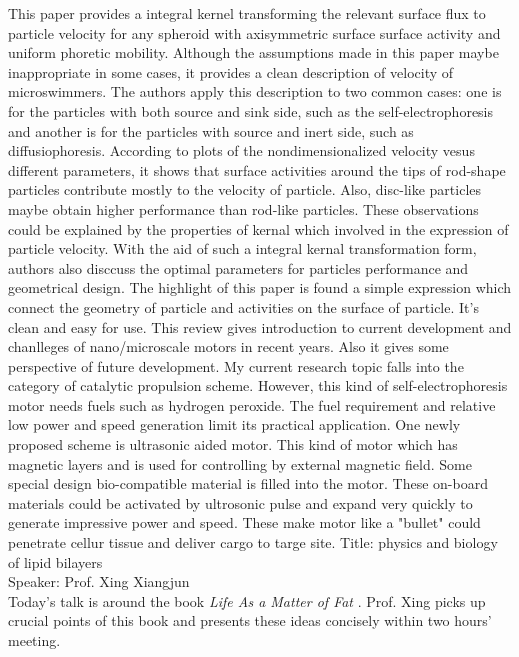\documentclass[fontsize=11pt, %
                             paper=a4, %
                             twoside, %
                             captions=tableheading,
                             index=totoc,
                             hyperref]{labbook}
\begin{document}
\begin{addmargin}[4cm]{0cm}
This paper provides a integral kernel transforming the relevant surface flux to particle velocity for any spheroid with axisymmetric surface surface activity and uniform phoretic mobility. Although the assumptions made in this paper maybe inappropriate in some cases, it provides a clean description of velocity of microswimmers. The authors apply this description to two common cases: one is for the particles with both source and sink side, such as the self-electrophoresis and another is for the particles with source and inert side, such as diffusiophoresis. According to plots of the nondimensionalized velocity vesus different parameters, it shows that surface activities around the tips of rod-shape particles contribute mostly to the velocity of particle. Also, disc-like particles maybe obtain higher performance than rod-like particles. These observations could be explained by the properties of kernal which involved in the expression of particle velocity. With the aid of such a integral kernal transformation form, authors also disccuss the optimal parameters for particles performance and geometrical design. The highlight of this paper is found a simple expression which connect the geometry of particle and activities on the surface of particle. It's clean and easy for use.
This review gives introduction to current development and chanlleges of nano/microscale motors in recent years. Also it gives some perspective of future development. My current research topic falls into the category of catalytic propulsion scheme. However, this kind of self-electrophoresis motor needs fuels such as  hydrogen peroxide. The fuel requirement and relative low power and speed generation limit its practical application. One newly proposed scheme is ultrasonic aided motor. This kind of motor which has magnetic layers and is used for controlling by external magnetic field. Some special design bio-compatible material is filled into the motor. These on-board materials could be activated by ultrosonic pulse and expand very quickly to generate impressive power and speed. These make motor like a "bullet" could penetrate cellur tissue and deliver cargo to targe site. 
\large Title: physics and biology of lipid bilayers\\
\large Speaker: Prof. Xing Xiangjun\\
\normalsize
Today's talk is around the book \emph{Life \textemdash As a Matter of Fat} \cite{Mouritsen2005}. Prof. Xing picks up crucial points of this book and presents these ideas concisely within two hours' meeting. \\

\end{addmargin}
\end{document}
